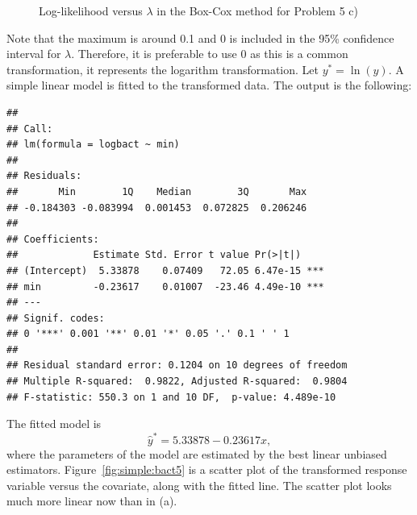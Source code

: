 \begin{solution}{2.22}
\begin{enumerate}
\begin{figure}
\begin{center}
\begin{knitrout}
\end{knitrout}
\end{center}
\caption{Log-likelihood versus $\lambda$ in the Box-Cox method for Problem 5 c)} \label{fig:simple:bact4}
\end{figure}

Note that the maximum is around 0.1 and 0 is included in the 95\% confidence interval for $\lambda$. Therefore, it is preferable to use 0 as this is a common transformation, it represents the logarithm transformation. Let $y^{*}=\ln(y)$. A simple linear model is fitted to the transformed data. The output is the following:
\begin{knitrout}
\color{fgcolor}\begin{kframe}
\begin{alltt}
 \hlkwb{<-} 
 \hlkwb{<-} \hlopt{~}
\end{alltt}
\begin{verbatim}
##
## Call:
## lm(formula = logbact ~ min)
##
## Residuals:
##       Min        1Q    Median        3Q       Max
## -0.184303 -0.083994  0.001453  0.072825  0.206246
##
## Coefficients:
##             Estimate Std. Error t value Pr(>|t|)
## (Intercept)  5.33878    0.07409   72.05 6.47e-15 ***
## min         -0.23617    0.01007  -23.46 4.49e-10 ***
## ---
## Signif. codes:
## 0 '***' 0.001 '**' 0.01 '*' 0.05 '.' 0.1 ' ' 1
##
## Residual standard error: 0.1204 on 10 degrees of freedom
## Multiple R-squared:  0.9822,	Adjusted R-squared:  0.9804
## F-statistic: 550.3 on 1 and 10 DF,  p-value: 4.489e-10
\end{verbatim}
\end{kframe}
\end{knitrout}

The fitted model is $$\hat{y}^{*}=5.33878-0.23617x,$$ where the parameters of the model are estimated by the best linear unbiased estimators. Figure~\ref{fig:simple:bact5} is a scatter plot of the transformed response variable versus the covariate, along with the fitted line. The scatter plot looks much more linear now than in (a).

\begin{figure}
\begin{center}
\begin{knitrout}
\color{fgcolor}


\end{knitrout}
\end{center}
\end{figure}
\end{enumerate}
\end{solution}
